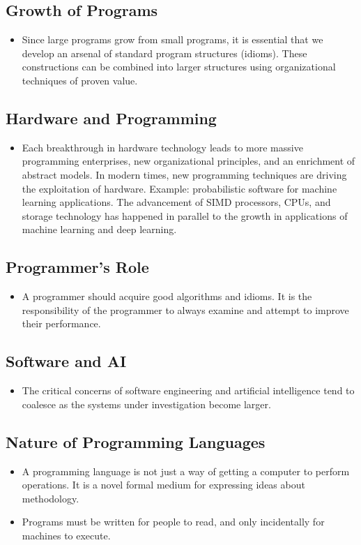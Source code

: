 \documentclass[11pt]{article}
\begin{document}
\subsection*{Growth of Programs}
\label{sec:org3343576}
\begin{itemize}
\item Since large programs grow from small programs, it is essential that we develop an arsenal of standard program structures (idioms). These constructions can be combined into larger structures using organizational techniques of proven value.
\end{itemize}
\subsection*{Hardware and Programming}
\label{sec:org21c5a5b}
\begin{itemize}
\item Each breakthrough in hardware technology leads to more massive programming enterprises, new organizational principles, and an enrichment of abstract models. In modern times, new programming techniques are driving the exploitation of hardware. Example: probabilistic software for machine learning applications. The advancement of SIMD processors, CPUs, and storage technology has happened in parallel to the growth in applications of machine learning and deep learning.
\end{itemize}
\subsection*{Programmer’s Role}
\label{sec:org1c92ac5}
\begin{itemize}
\item A programmer should acquire good algorithms and idioms. It is the responsibility of the programmer to always examine and attempt to improve their performance.
\end{itemize}
\subsection*{Software and AI}
\label{sec:orgd7fe6cf}
\begin{itemize}
\item The critical concerns of software engineering and artificial intelligence tend to coalesce as the systems under investigation become larger.
\end{itemize}
\subsection*{Nature of Programming Languages}
\label{sec:org2cda380}
\begin{itemize}
\item A programming language is not just a way of getting a computer to perform operations. It is a novel formal medium for expressing ideas about methodology.
\item Programs must be written for people to read, and only incidentally for machines to execute.
\end{itemize}
\end{document}
